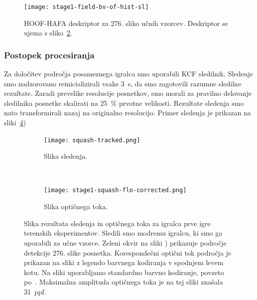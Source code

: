 \begin{figure}[!htb]
	\centering
	\texttt{[image: stage1-field-bv-of-hist-sl]}
	\caption[HOOF-HAFA deskriptor za 276. sliko učnih vzorcev]{HOOF-HAFA deskriptor za 276. sliko učnih vzorcev. Deskriptor se ujema s sliko~\ref{fig:sledenje-squash}.}
	\label{fig:hoof-hafa}
\end{figure}

\subsubsection{Postopek procesiranja}
Za določitev področja posameznega igralca smo uporabili KCF sledilnik. 
Sledenje smo nadzorovano reinicializirali vsake \SI{3}{\s}, da smo zagotovili razumne sledilne rezultate. Zaradi prevelike resolucije posnetkov, smo morali za pravilno delovanje sledilnika posnetke skalirati na \SI{25}{\%} prvotne velikosti. Rezultate sledenja smo nato transformirali nazaj na originalno resolucijo. Primer sledenja je prikazan na sliki~\ref{fig:squash})

\begin{figure}[!htb]
	\centering
	\begin{subfigure}[t]{0.45\columnwidth}
		\centering
		\texttt{[image: squash-tracked.png]}
		\caption{Slika sledenja.}
	    \label{fig:sledenje-squash}
	\end{subfigure}
	~
	\begin{subfigure}[t]{0.45\columnwidth}
		\centering
		\texttt{[image: stage1-squash-flo-corrected.png]}
		\caption{Slika optičnega toka.}
		\label{fig:of-squash}
	\end{subfigure}
	\caption[Slika sledenja in optičnega toka za igralca terenskih eksperimentov]{Slika rezultata sledenja in optičnega toka za igralca prve igre terenskih eksperimentov. Sledili smo modremu igralcu, ki smo ga uporabili za učne vzorce. Zeleni okvir na sliki ) prikazuje področje detekcije 276. slike posnetka. Korespondečni optični tok področja je prikazan na sliki  z legendo barvnega kodiranja v spodnjem levem kotu. Na sliki uporabljamo standardno barvno kodiranje, povzeto po~\cite{baker2011database}. Maksimalna amplituda optičnega toka je na tej sliki znašala \SI{31}{ppf}. }
	\label{fig:squash}
\end{figure}

